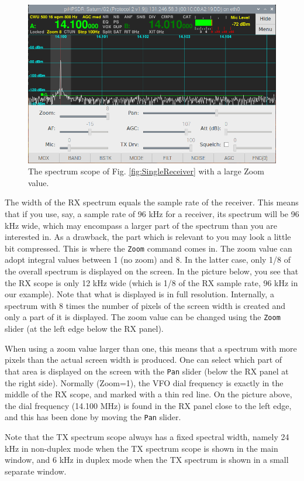 \documentclass[12pt]{book}
\def\rett#1{\texttt{\color{red}#1}}
\def\bltt#1{\texttt{\color{blue}#1}}
\begin{document}
\begin{figure}[ht]
\center
\includegraphics[width=12cm]{ZoomPan.png}
\caption{The spectrum scope of Fig. \ref{fig:SingleReceiver} with a
large Zoom value.}
\end{figure}

The width of the RX spectrum equals the sample rate
of the receiver. This means that if you use, say,
a sample rate of 96 kHz for a receiver, its spectrum
will be 96 kHz wide, which may encompass a larger part
of the spectrum than you are interested in. As a drawback,
the part which is relevant to you may look a little bit
compressed. This is where the \bltt{Zoom} command
comes in. The zoom value can adopt integral values between
1 (no zoom) and 8. In the latter case, only 1/8 of the
overall spectrum is displayed on the screen. In the
picture below, you see that the RX scope is only 12 kHz
wide (which is 1/8 of the RX sample rate, 96 kHz in our
example). Note that what is displayed is in full resolution.
Internally, a spectrum with 8 times the number of pixels
of the screen width is created and only a part of it is
displayed. The zoom value can be changed using the \rett{Zoom}
slider (at the left edge below the RX panel).


When using a zoom value larger than one, this means that
a spectrum with more pixels than the actual screen width
is produced. One can select which part of that area
is displayed on the screen with the \rett{Pan} slider
(below the RX panel at the right side). Normally (Zoom=1),
the VFO dial frequency is exactly in the middle of the
RX scope, and marked with a thin red line. On the picture
above, the dial frequency (14.100 MHz) is found in the RX
panel close to the left edge, and this has been done
by moving the \rett{Pan} slider.

Note that the TX spectrum scope always has a fixed spectral
width, namely 24 kHz in non-duplex mode when the TX spectrum
scope is shown in the main window, and 6 kHz in duplex mode
when the TX spectrum is shown in a small separate window.
\end{document}
